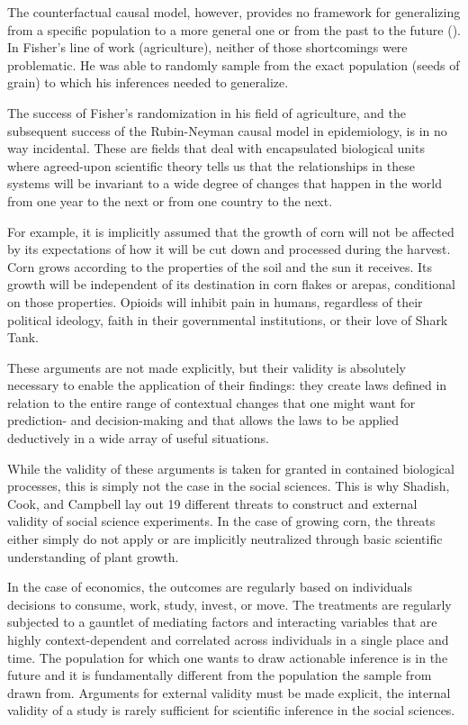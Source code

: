 \documentclass[a4paper,12pt]{article}
\begin{document}
The counterfactual causal model, however, provides no framework for generalizing from a specific population to a more general one or from the past to the future (\cite{Heckman2008}). In Fisher's line of work (agriculture), neither of those shortcomings were problematic. He was able to randomly sample from the exact population (seeds of grain) to which his inferences needed to generalize. 

The success of Fisher's randomization in his field of agriculture, and the subsequent success of the Rubin-Neyman causal model in epidemiology, is in no way incidental. These are fields that deal with encapsulated biological units where agreed-upon scientific theory tells us that the relationships in these systems will be invariant to a wide degree of changes that happen in the world from one year to the next or from one country to the next.

For example, it is implicitly assumed that the growth of corn will not be affected by its expectations of how it will be cut down and processed during the harvest. Corn grows according to the properties of the soil and the sun it receives. Its growth will be independent of its destination in corn flakes or arepas, conditional on those properties. Opioids will inhibit pain in humans, regardless of their political ideology, faith in their governmental institutions, or their love of Shark Tank. 

These arguments are not made explicitly, but their validity is absolutely necessary to enable the application of their findings: they create laws defined in relation to the entire range of contextual changes that one might want for prediction- and decision-making and that allows the laws to be applied deductively in a wide array of useful situations. 

While the validity of these arguments is taken for granted in contained biological processes, this is simply not the case in the social sciences. This is why Shadish, Cook, and Campbell lay out 19 different threats to construct and external validity of social science experiments. In the case of growing corn, the threats either simply do not apply or are implicitly neutralized through basic scientific understanding of plant growth. 

In the case of economics, the outcomes are regularly based on individuals decisions to consume, work, study, invest, or move. The treatments are regularly subjected to a gauntlet of mediating factors and interacting variables that are highly context-dependent and correlated across individuals in a single place and time. The population for which one wants to draw actionable inference is in the future and it is fundamentally different from the population the sample from drawn from. Arguments for external validity must be made explicit, the internal validity of a study is rarely sufficient for scientific inference in the social sciences. 
\end{document}
